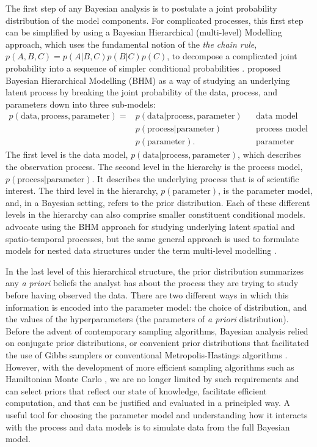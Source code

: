 The first step of any Bayesian analysis is to postulate a joint probability distribution of the model components. For complicated processes, this first step can be simplified by using a Bayesian Hierarchical (multi-level) Modelling approach, which uses the fundamental notion of the \textit{the chain rule}, $p(A, B, C) = p(A|B, C) p(B|C) p(C)$, to decompose a complicated joint probability into a sequence of simpler conditional probabilities \citep[p.~13]{wikle_2019}. \citet{Berliner_1996} proposed Bayesian Hierarchical Modelling (BHM) as a way of studying an underlying latent process by breaking the joint probability of the data, process, and parameters down into three sub-models:
\begin{align*}
 p(\text{data}, \text{process}, \text{parameter}) = & p(\text{data}| \text{process}, \text{parameter}) && \text{data model} \\
 & p(\text{process}| \text{parameter}) && \text{process model} \\
 & p(\text{parameter}). && \text{parameter model}
\end{align*}
The first level is the data model, $p(\text{data} | \text{process}, \text{parameter})$, which describes the observation process. The second level in the hierarchy is the process model, $p(\mbox{process} | \text{parameter})$. It describes the underlying process that is of scientific interest. The third level in the hierarchy, $p(\text{parameter})$, is the parameter model, and, in a Bayesian setting, refers to the prior distribution. Each of these different levels in the hierarchy can also comprise smaller constituent conditional models. \citet{cressie_2011} advocate using the BHM approach for studying underlying latent spatial and spatio-temporal processes, but the same general approach is used to formulate models for nested data structures under the term multi-level modelling \citep{BDA2020}. 

In the last level of this hierarchical structure, the prior distribution summarizes any \textit{a priori} beliefs the analyst has about the process they are trying to study before having observed the data. There are two different ways in which this information is encoded into the parameter model: the choice of distribution, and the values of the hyperparameters (the parameters of \textit{a priori} distribution). Before the advent of contemporary sampling algorithms, Bayesian analysis relied on conjugate prior distributions, or convenient prior distributions that facilitated the use of Gibbs samplers or conventional Metropolis-Hastings algorithms \citep{gilks_1996}. However, with the development of more efficient sampling algorithms such as Hamiltonian Monte Carlo \citep{betancourt_2017}, we are no longer limited by such requirements and can select priors that reflect our state of knowledge, facilitate efficient computation, and that can be justified and evaluated in a principled way. A useful tool for choosing the parameter model and understanding how it interacts with the process and data models is to simulate data from the full Bayesian model.

